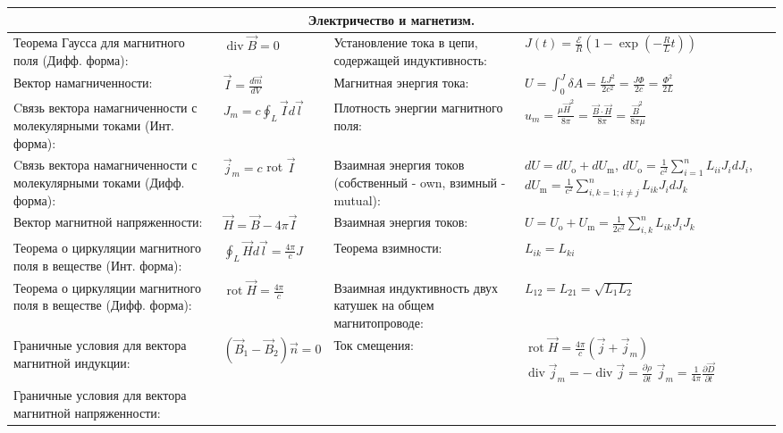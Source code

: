 \documentclass{article}
\begin{document}
\newpage

\begin{tabular}{ |p{6cm}|p{3.5cm}|p{6cm}|p{3.5cm}|  }
\hline
\multicolumn{4}{|c|}{Электричество и магнетизм.} \\
\hline
Теорема Гаусса для магнитного поля (Дифф. форма): &
$\operatorname{div} \vec{B}=0$ &
Установление тока в цепи, содержащей индуктивность: &
$J(t)=\frac{\mathcal{E}}{R}\left(1-\exp \left(-\frac{R}{L} t\right)\right)$ \\
\hline
Вектор намагниченности: &
$\vec{I}=\frac{d \vec{m}}{d V}$ &
Магнитная энергия тока: &
$U=\int_{0}^{J} \delta A=\frac{L J^{2}}{2 c^{2}}=\frac{J \Phi}{2 c}=\frac{\Phi^{2}}{2 L}$\\
\hline
Cвязь вектора намагниченности с молекулярными токами (Инт. форма): & 
$J_{m}=c \oint_{L} \vec{I} d {\vec l}$ &
Плотность энергии магнитного поля: &
$u_{m}=\frac{\mu \vec{H}^{2}}{8 \pi}=\frac{\vec{B} \cdot \vec{H}}{8 \pi}=\frac{\vec{B}^{2}}{8 \pi \mu}$ \\
\hline
Cвязь вектора намагниченности с молекулярными токами (Дифф. форма): & 
$\vec{j}_{m}=c$ rot $\vec{I}$ &
Взаимная энергия токов (собственный - own, взимный - mutual):&
$d U=d U_{\mathrm{o}}+d U_{\mathrm{m}}$,
$d U_{\mathrm{o}}=\frac{1}{c^{2}} \sum_{i=1}^{n} L_{i i} J_{i} d J_{i}$,
$d U_{\mathrm{m}}=\frac{1}{c^{2}} \sum_{i, k=1 ; i \neq j}^{n} L_{i k} J_{i} d J_{k}$\\
\hline
Вектор магнитной напряженности: &
$\vec{H}=\vec{B} - 4 \pi \vec{I}$ &
Взаимная энергия токов: &
$U=U_{\mathrm{o}}+U_{\mathrm{m}}=\frac{1}{2 c^{2}} \sum_{i, k}^{n} L_{i k} J_{i} J_{k}$ \\
\hline
Теорема о циркуляции магнитного поля в веществе (Инт. форма): &
$\oint_{L} \vec{H} d \vec{l}=\frac{4 \pi}{c} J$ &
Теорема взимности: &
$L_{i k}=L_{k i}$\\
\hline
Теорема о циркуляции магнитного поля в веществе (Дифф. форма): &
$\operatorname{rot} \vec{H}=\frac{4 \pi}{c}$ &
Взаимная индуктивность двух катушек на общем магнитопроводе: &
$L_{12}=L_{21}=\sqrt{L_{1} L_{2}}$\\
\hline
Граничные условия для вектора магнитной индукции: &
$\left(\vec{B}_{1}-\vec{B}_{2}\right) \vec{n}=0$ &
Ток смещения: &
$\operatorname{rot} \vec{H}=\frac{4 \pi}{c}\left(\vec{j}+\vec{j}_{m}\right)$
$\operatorname{div} \vec{j}_{m}=-\operatorname{div} \vec{j}=\frac{\partial \rho}{\partial t}$
$\vec{j}_{m}=\frac{1}{4 \pi} \frac{\partial \vec{D}}{\partial t}$\\
\hline
Граничные условия для вектора магнитной напряженности: &

\end{tabular}
\end{document}
